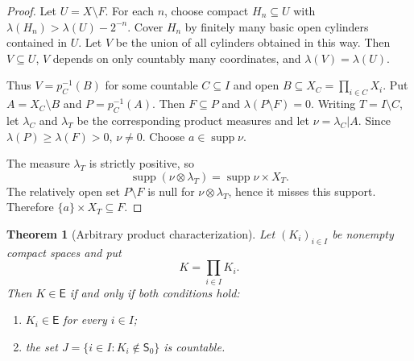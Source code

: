 \documentclass[11pt]{article}
\newtheorem{theorem}{Theorem}
\newcommand{\E}{\mathsf E}
\newcommand{\Szero}{\mathsf S_0}
\newcommand{\supp}{\operatorname{supp}}
\begin{document}
\begin{proof}
Let \(U=X\setminus F\).  For each \(n\), choose compact \(H_n\subseteq U\) with
\(\lambda(H_n)>\lambda(U)-2^{-n}\).  Cover \(H_n\) by finitely many basic open
cylinders contained in \(U\).  Let \(V\) be the union of all cylinders obtained
in this way.  Then \(V\subseteq U\), \(V\) depends on only countably many
coordinates, and \(\lambda(V)=\lambda(U)\).

Thus \(V=p_C^{-1}(B)\) for some countable \(C\subseteq I\) and open
\(B\subseteq X_C=\prod_{i\in C}X_i\).  Put \(A=X_C\setminus B\) and
\(P=p_C^{-1}(A)\).  Then \(F\subseteq P\) and \(\lambda(P\setminus F)=0\).
Writing \(T=I\setminus C\), let \(\lambda_C\) and \(\lambda_T\) be the
corresponding product measures and let \(\nu=\lambda_C|A\).  Since
\(\lambda(P)\ge\lambda(F)>0\), \(\nu\neq0\).  Choose \(a\in\supp\nu\).

The measure \(\lambda_T\) is strictly positive, so
\[
  \supp(\nu\otimes\lambda_T)=\supp\nu\times X_T .
\]
The relatively open set \(P\setminus F\) is null for \(\nu\otimes\lambda_T\),
hence it misses this support.  Therefore \(\{a\}\times X_T\subseteq F\).
\end{proof}

\begin{theorem}[Arbitrary product characterization]
Let \((K_i)_{i\in I}\) be nonempty compact spaces and put
\[
  K=\prod_{i\in I}K_i .
\]
Then \(K\in\E\) if and only if both conditions hold:
\begin{enumerate}
\item \(K_i\in\E\) for every \(i\in I\);
\item the set \(J=\{i\in I:K_i\notin\Szero\}\) is countable.
\end{enumerate}
\end{theorem}
\end{document}
